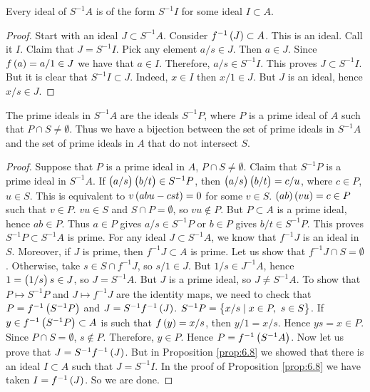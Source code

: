 \begin{proposition}
\label{prop:6.8}
Every ideal of $ S^{-1}A $ is of the form $ S^{-1}I $ for some ideal $ I \subset A $.
\end{proposition}

\begin{proof}
Start with an ideal $ J \subset S^{-1}A $. Consider $ f^{-1}\br{J} \subset A $. This is an ideal. Call it $ I $. Claim that $ J = S^{-1}I $. Pick any element $ a / s \in J $. Then $ a \in J $. Since $ f\br{a} = a / 1 \in J $ we have that $ a \in I $. Therefore, $ a / s \in S^{-1}I $. This proves $ J \subset S^{-1}I $. But it is clear that $ S^{-1}I \subset J $. Indeed, $ x \in I $ then $ x / 1 \in J $. But $ J $ is an ideal, hence $ x / s \in J $.
\end{proof}

\begin{theorem}
\label{thm:6.9}
The prime ideals in $ S^{-1}A $ are the ideals $ S^{-1}P $, where $ P $ is a prime ideal of $ A $ such that $ P \cap S \ne \emptyset $. Thus we have a bijection between the set of prime ideals in $ S^{-1}A $ and the set of prime ideals in $ A $ that do not intersect $ S $.
\end{theorem}

\begin{proof}
Suppose that $ P $ is a prime ideal in $ A $, $ P \cap S \ne \emptyset $. Claim that $ S^{-1}P $ is a prime ideal in $ S^{-1}A $. If $ \br{a / s}\br{b / t} \in S^{-1}P $, then $ \br{a / s}\br{b / t} = c / u $, where $ c \in P $, $ u \in S $. This is equivalent to $ v\br{abu - cst} = 0 $ for some $ v \in S $. $ \br{ab}\br{vu} = c \in P $ such that $ v \in P $. $ vu \in S $ and $ S \cap P = \emptyset $, so $ vu \notin P $. But $ P \subset A $ is a prime ideal, hence $ ab \in P $. Thus $ a \in P $ gives $ a / s \in S^{-1}P $ or $ b \in P $ gives $ b / t \in S^{-1}P $. This proves $ S^{-1}P \subset S^{-1}A $ is prime. For any ideal $ J \subset S^{-1}A $, we know that $ f^{-1}J $ is an ideal in $ S $. Moreover, if $ J $ is prime, then $ f^{-1}J \subset A $ is prime. Let us show that $ f^{-1}J \cap S = \emptyset $. Otherwise, take $ s \in S \cap f^{-1}J $, so $ s / 1 \in J $. But $ 1 / s \in J^{-1}A $, hence $ 1 = \br{1 / s}s \in J $, so $ J = S^{-1}A $. But $ J $ is a prime ideal, so $ J \ne S^{-1}A $. To show that $ P \mapsto S^{-1}P $ and $ J \mapsto f^{-1}J $ are the identity maps, we need to check that $ P = f^{-1}\br{S^{-1}P} $ and $ J = S^{-1}f^{-1}\br{J} $. $ S^{-1}P = \cbr{x / s \mid x \in P, \ s \in S} $. If $ y \in f^{-1}\br{S^{-1}P} \subset A $ is such that $ f\br{y} = x / s $, then $ y / 1 = x / s $. Hence $ ys = x \in P $. Since $ P \cap S = \emptyset $, $ s \notin P $. Therefore, $ y \in P $. Hence $ P = f^{-1}\br{S^{-1}A} $. Now let us prove that $ J = S^{-1}f^{-1}\br{J} $. But in Proposition \ref{prop:6.8} we showed that there is an ideal $ I \subset A $ such that $ J = S^{-1}I $. In the proof of Proposition \ref{prop:6.8} we have taken $ I = f^{-1}\br{J} $. So we are done.
\end{proof}

